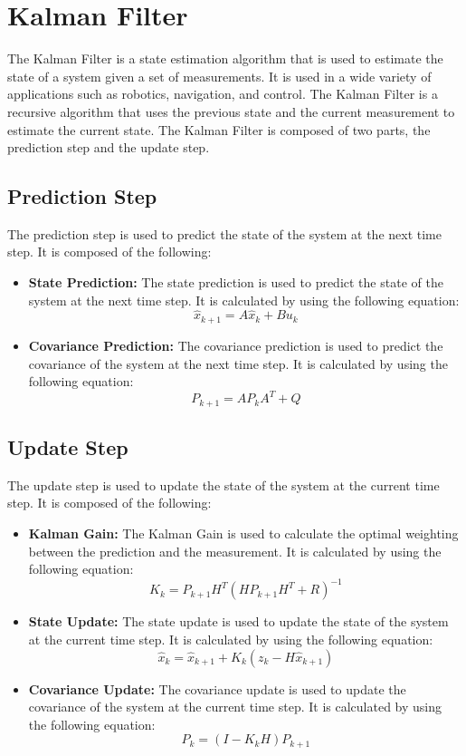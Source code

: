 \documentclass[12pt]{article}
\numberwithin{equation}{section}
\begin{document}
\section{Kalman Filter}
The Kalman Filter is a state estimation algorithm that is used to estimate the state of a system given a set of measurements. It is used in a wide variety of applications such as robotics, navigation, and control. The Kalman Filter is a recursive algorithm that uses the previous state and the current measurement to estimate the current state. The Kalman Filter is composed of two parts, the prediction step and the update step. 
\subsection{Prediction Step}
The prediction step is used to predict the state of the system at the next time step. It is composed of the following:
\begin{itemize}
  \item \textbf{State Prediction:} The state prediction is used to predict the state of the system at the next time step. It is calculated by using the following equation:
    \begin{equation}
      \hat{x}_{k+1} = A\hat{x}_k + B u_k
    \end{equation}
  \item \textbf{Covariance Prediction:} The covariance prediction is used to predict the covariance of the system at the next time step. It is calculated by using the following equation:
    \begin{equation}
      P_{k+1} = A P_k A^T + Q
    \end{equation}
\end{itemize}
\subsection{Update Step}
The update step is used to update the state of the system at the current time step. It is composed of the following:
\begin{itemize}
  \item \textbf{Kalman Gain:} The Kalman Gain is used to calculate the optimal weighting between the prediction and the measurement. It is calculated by using the following equation:
    \begin{equation}
      K_k = P_{k+1} H^T (H P_{k+1} H^T + R)^{-1}
    \end{equation}
  \item \textbf{State Update:} The state update is used to update the state of the system at the current time step. It is calculated by using the following equation:
    \begin{equation}
      \hat{x}_k = \hat{x}_{k+1} + K_k (z_k - H \hat{x}_{k+1})
    \end{equation}
  \item \textbf{Covariance Update:} The covariance update is used to update the covariance of the system at the current time step. It is calculated by using the following equation:
    \begin{equation}
      P_k = (I - K_k H) P_{k+1}
    \end{equation}
\end{itemize}
\end{document}

